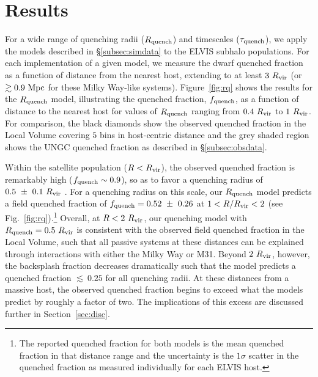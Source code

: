 


\section{Results}
\label{sec:results}

For a wide range of quenching radii ($R_{\rm quench}$) and timescales
($\tau_{\rm quench}$), we apply the models described in
\S\ref{subsec:simdata} to the ELVIS subhalo populations. 
%
For each implementation of a given model, we measure the dwarf
quenched fraction as a function of distance from the nearest host,
extending to at least $3~R_{\rm{vir}}$ (or $\gtrsim 0.9~{\rm Mpc}$ for these
Milky Way-like systems).
%
Figure~\ref{fig:rq} shows the results for the $R_{\rm quench}$ model,
illustrating the quenched fraction, $f_{\rm quench}$, as a function of distance
to the nearest host for values of $R_{\rm quench}$ ranging from $0.4~R_{\rm{vir}}$ to
$1~R_{\rm{vir}}$.
%
For comparison, the black diamonds show the observed quenched fraction in the
Local Volume covering $5$ bins in host-centric distance and the grey
shaded region shows the UNGC quenched fraction as described in
\S\ref{subsec:obsdata}. 
%


Within the satellite population ($R < R_{\rm{vir}}$), the observed quenched fraction is
remarkably high ($f_{\rm quench} \sim 0.9$), so as to favor a quenching radius
of $0.5~\pm~0.1~R_{\rm{vir}}$ \citep{fham15}.
%
For a quenching radius on this scale, our $R_{\rm quench}$ model predicts a
field quenched fraction of $f_{\rm quench}=0.52~\pm~0.26$ at $1 < R/R_{\rm{vir}} < 2$
(see Fig.~\ref{fig:rq}).\footnote{The reported quenched fraction for both models
  is the mean quenched fraction in that distance range and the uncertainty is
  the $1\sigma$ scatter in the quenched fraction as measured individually for
  each ELVIS host.}
%
Overall, at $R < 2~R_{\rm{vir}}$, our quenching model with $R_{\rm quench} = 0.5~R_{\rm{vir}}$
is consistent with the observed field quenched fraction in the Local Volume,
such that all passive systems at these distances can be explained through
interactions with either the Milky Way or M31.
%
Beyond $2~R_{\rm{vir}}$, however, the backsplash fraction decreases dramatically such
that the model predicts a quenched fraction $\lesssim~0.25$ for all quenching
radii.
%
At these distances from a massive host, the observed quenched fraction begins to
exceed what the models predict by roughly a factor of two. The implications of
this excess are discussed further in Section~\ref{sec:disc}.




